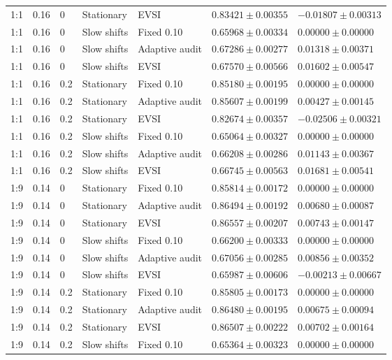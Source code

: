 \begin{longtable}{@{}lllllll@{}}
1:1 & 0.16 & 0 & Stationary & EVSI & $0.83421 \pm 0.00355$ & $-0.01807 \pm 0.00313$ \\
1:1 & 0.16 & 0 & Slow shifts & Fixed 0.10 & $0.65968 \pm 0.00334$ & $0.00000 \pm 0.00000$ \\
1:1 & 0.16 & 0 & Slow shifts & Adaptive audit & $0.67286 \pm 0.00277$ & $0.01318 \pm 0.00371$ \\
1:1 & 0.16 & 0 & Slow shifts & EVSI & $0.67570 \pm 0.00566$ & $0.01602 \pm 0.00547$ \\
1:1 & 0.16 & 0.2 & Stationary & Fixed 0.10 & $0.85180 \pm 0.00195$ & $0.00000 \pm 0.00000$ \\
1:1 & 0.16 & 0.2 & Stationary & Adaptive audit & $0.85607 \pm 0.00199$ & $0.00427 \pm 0.00145$ \\
1:1 & 0.16 & 0.2 & Stationary & EVSI & $0.82674 \pm 0.00357$ & $-0.02506 \pm 0.00321$ \\
1:1 & 0.16 & 0.2 & Slow shifts & Fixed 0.10 & $0.65064 \pm 0.00327$ & $0.00000 \pm 0.00000$ \\
1:1 & 0.16 & 0.2 & Slow shifts & Adaptive audit & $0.66208 \pm 0.00286$ & $0.01143 \pm 0.00367$ \\
1:1 & 0.16 & 0.2 & Slow shifts & EVSI & $0.66745 \pm 0.00563$ & $0.01681 \pm 0.00541$ \\
1:9 & 0.14 & 0 & Stationary & Fixed 0.10 & $0.85814 \pm 0.00172$ & $0.00000 \pm 0.00000$ \\
1:9 & 0.14 & 0 & Stationary & Adaptive audit & $0.86494 \pm 0.00192$ & $0.00680 \pm 0.00087$ \\
1:9 & 0.14 & 0 & Stationary & EVSI & $0.86557 \pm 0.00207$ & $0.00743 \pm 0.00147$ \\
1:9 & 0.14 & 0 & Slow shifts & Fixed 0.10 & $0.66200 \pm 0.00333$ & $0.00000 \pm 0.00000$ \\
1:9 & 0.14 & 0 & Slow shifts & Adaptive audit & $0.67056 \pm 0.00285$ & $0.00856 \pm 0.00352$ \\
1:9 & 0.14 & 0 & Slow shifts & EVSI & $0.65987 \pm 0.00606$ & $-0.00213 \pm 0.00667$ \\
1:9 & 0.14 & 0.2 & Stationary & Fixed 0.10 & $0.85805 \pm 0.00173$ & $0.00000 \pm 0.00000$ \\
1:9 & 0.14 & 0.2 & Stationary & Adaptive audit & $0.86480 \pm 0.00195$ & $0.00675 \pm 0.00094$ \\
1:9 & 0.14 & 0.2 & Stationary & EVSI & $0.86507 \pm 0.00222$ & $0.00702 \pm 0.00164$ \\
1:9 & 0.14 & 0.2 & Slow shifts & Fixed 0.10 & $0.65364 \pm 0.00323$ & $0.00000 \pm 0.00000$ \\

\end{longtable}

